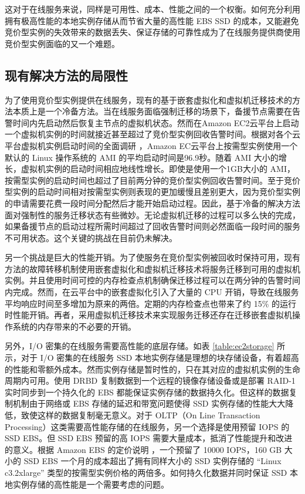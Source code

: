 这对于在线服务来说，同样是可用性、成本、性能之间的一个权衡。如何充分利用拥有极高性能的本地实例存储从而节省大量的高性能 EBS SSD 的成本，又能避免竞价型实例的失效带来的数据丢失、保证存储的可靠性成为了在线服务提供商使用竞价型实例面临的又一个难题。
\subsection{现有解决方法的局限性}
\label{sec:gemini_challenges}
为了使用竞价型实例提供在线服务，现有的基于嵌套虚拟化和虚拟机迁移技术的方法\cite{He:2015:CCH:2749246.2749275}本质上是一个冷备方法。当在线服务面临强制迁移的场景下，备援节点需要在告警时间内先启动然后恢复主节点的虚拟机状态。然而在Amazon EC2云平台上启动一个虚拟机实例的时间就接近甚至超过了竞价型实例回收告警时间。根据对各个云平台虚拟机实例启动时间的全面调研 \cite{Mao:2012:PSV:2353730.2353859}，Amazon EC云平台上按需型实例使用一个默认的 Linux 操作系统的 AMI 的平均启动时间是96.9秒。随着 AMI 大小的增长，虚拟机实例的启动时间相应地线性增长。即使是使用一个1GB大小的 AMI，按需型实例的启动时间也超过了目前两分钟的竞价型实例回收告警时间。至于竞价型实例的启动时间相对按需型实例则表现的更加缓慢且差别更大，因为竞价型实例的申请需要花费一段时间分配然后才能开始启动过程。因此，基于冷备的解决方法面对强制性的服务迁移状态有些微妙。无论虚拟机迁移的过程可以多么快的完成，如果备援节点的启动过程所需时间超过了回收告警时间则必然面临一段时间的服务不可用状态。这个关键的挑战在目前仍未解决。

另一个挑战是巨大的性能开销。为了使服务在竞价型实例被回收时保持可用，现有方法的故障转移机制使用嵌套虚拟化和虚拟机迁移技术将服务迁移到可用的虚拟机实例。并且使用时间可控的内存检查点机制确保迁移过程可以在两分钟的告警时间内完成。然而，在云平台中的嵌套虚拟化引入了大量的 CPU 开销，导致在线服务平均响应时间至多增加为原来的两倍。定期的内存检查点也带来了约 15\% 的运行时性能开销。再者，采用虚拟机迁移技术来实现服务迁移还存在迁移嵌套虚拟机操作系统的内存带来的不必要的开销。

另外，I/O 密集的在线服务需要高性能的底层存储。如表 \ref{table:ec2storage} 所示，对于 I/O 密集的在线服务 SSD 本地实例存储是理想的块存储设备，有着超高的性能和零额外成本。然而实例存储是暂时性的，只在其对应的虚拟机实例的生命周期内可用。使用 DRBD 复制数据到一个远程的镜像存储设备或是部署 RAID-1 实时同步到一个持久化的 EBS 都能保证实例存储的数据持久化。但这样的数据复制机制由于网络或 EBS 存储的延迟和带宽问题使得 SSD 实例存储的性能大大降低，致使这样的数据复制毫无意义。对于 OLTP（On Line Transaction Processing）这类需要高性能存储的在线服务，另一个选择是使用预留 IOPS 的 SSD EBS。但 SSD EBS 预留的高 IOPS 需要大量成本，抵消了性能提升和改进的意义。根据 Amazon EBS 的定价说明 \cite{EBSPricing:2015}，一个预留了 10000 IOPS，160 GB 大小的 SSD EBS 一个月的成本超出了拥有同样大小的 SSD 实例存储的 ``Linux c3.2xlarge'' 类型的按需型实例价格的两倍多。如何持久化数据并同时保证 SSD 本地实例存储的高性能是一个需要考虑的问题。


